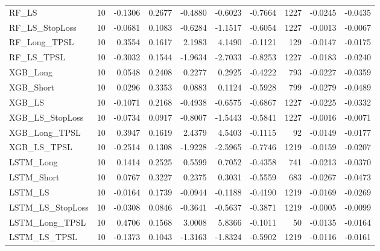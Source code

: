 \begin{tabular}{llrrrrrrrr}
RF\_LS & 10 & -0.1306 & 0.2677 & -0.4880 & -0.6023 & -0.7664 & 1227 & -0.0245 & -0.0435 \\
\cline{1-10}
RF\_LS\_StopLoss & 10 & -0.0681 & 0.1083 & -0.6284 & -1.1517 & -0.6054 & 1227 & -0.0013 & -0.0067 \\
\cline{1-10}
RF\_Long\_TPSL & 10 & 0.3554 & 0.1617 & 2.1983 & 4.1490 & -0.1121 & 129 & -0.0147 & -0.0175 \\
\cline{1-10}
RF\_LS\_TPSL & 10 & -0.3032 & 0.1544 & -1.9634 & -2.7033 & -0.8253 & 1227 & -0.0183 & -0.0240 \\
\cline{1-10}
XGB\_Long & 10 & 0.0548 & 0.2408 & 0.2277 & 0.2925 & -0.4222 & 793 & -0.0227 & -0.0359 \\
\cline{1-10}
XGB\_Short & 10 & 0.0296 & 0.3353 & 0.0883 & 0.1124 & -0.5928 & 799 & -0.0279 & -0.0489 \\
\cline{1-10}
XGB\_LS & 10 & -0.1071 & 0.2168 & -0.4938 & -0.6575 & -0.6867 & 1227 & -0.0225 & -0.0332 \\
\cline{1-10}
XGB\_LS\_StopLoss & 10 & -0.0734 & 0.0917 & -0.8007 & -1.5443 & -0.5841 & 1227 & -0.0016 & -0.0071 \\
\cline{1-10}
XGB\_Long\_TPSL & 10 & 0.3947 & 0.1619 & 2.4379 & 4.5403 & -0.1115 & 92 & -0.0149 & -0.0177 \\
\cline{1-10}
XGB\_LS\_TPSL & 10 & -0.2514 & 0.1308 & -1.9228 & -2.5965 & -0.7746 & 1219 & -0.0159 & -0.0207 \\
\cline{1-10}
LSTM\_Long & 10 & 0.1414 & 0.2525 & 0.5599 & 0.7052 & -0.4358 & 741 & -0.0213 & -0.0370 \\
\cline{1-10}
LSTM\_Short & 10 & 0.0767 & 0.3227 & 0.2375 & 0.3031 & -0.5559 & 683 & -0.0267 & -0.0473 \\
\cline{1-10}
LSTM\_LS & 10 & -0.0164 & 0.1739 & -0.0944 & -0.1188 & -0.4190 & 1219 & -0.0169 & -0.0269 \\
\cline{1-10}
LSTM\_LS\_StopLoss & 10 & -0.0308 & 0.0846 & -0.3641 & -0.5637 & -0.3871 & 1219 & -0.0005 & -0.0099 \\
\cline{1-10}
LSTM\_Long\_TPSL & 10 & 0.4706 & 0.1568 & 3.0008 & 5.8366 & -0.1011 & 50 & -0.0135 & -0.0164 \\
\cline{1-10}
LSTM\_LS\_TPSL & 10 & -0.1373 & 0.1043 & -1.3163 & -1.8324 & -0.5902 & 1219 & -0.0116 & -0.0161 \\
\cline{1-10}
\bottomrule
\end{tabular}
